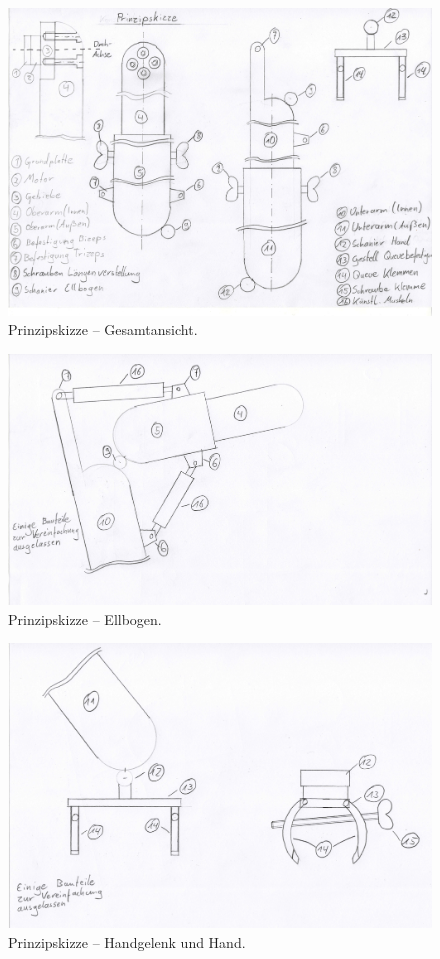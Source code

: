 	\begin{figure}[h]
		\centering
		\includegraphics[width=\textwidth]{Abb/Prinzipskizze_Gesamtansicht}
		\caption[Prinzipskizze -- Gesamtansicht]{Prinzipskizze -- Gesamtansicht.}
		\label{fig:prinzipskizze-gesamtansicht}
	\end{figure}

	\begin{figure}[h]
		\centering
		\includegraphics[width=\textwidth]{Abb/Prinzipskizze_Ellbogen}
		\caption[Prinzipskizze -- Ellbogen]{Prinzipskizze -- Ellbogen.}
		\label{fig:prinzipskizze-ellbogen}
	\end{figure}

	\begin{figure}[h]
		\centering
		\includegraphics[width=\textwidth]{Abb/Prinzipskizze_Handgelenk_und_Hand}
		\caption[Prinzipskizze -- Handgelenk und Hand]{Prinzipskizze -- Handgelenk und Hand.}
		\label{fig:prinzipskizze-handgelenk-und-hand}
	\end{figure}